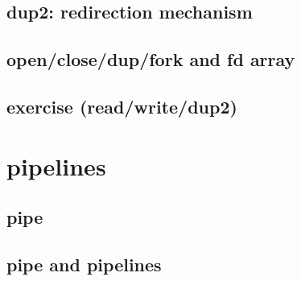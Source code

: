 

\subsection{dup2: redirection mechanism}



\subsection{open/close/dup/fork and fd array}



\subsection{exercise (read/write/dup2)}



\section{pipelines}

\subsection{pipe}





\subsection{pipe and pipelines}



